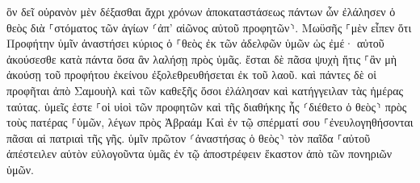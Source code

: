 \documentclass{openreader}
\begin{document}
ὃν δεῖ οὐρανὸν μὲν δέξασθαι ἄχρι χρόνων ἀποκαταστάσεως πάντων ὧν ἐλάλησεν ὁ θεὸς διὰ ⸀στόματος τῶν ἁγίων ⸂ἀπ’ αἰῶνος αὐτοῦ προφητῶν⸃. 
Μωϋσῆς ⸀μὲν εἶπεν ὅτι Προφήτην ὑμῖν ἀναστήσει κύριος ὁ ⸀θεὸς ἐκ τῶν ἀδελφῶν ὑμῶν ὡς ἐμέ· αὐτοῦ ἀκούσεσθε κατὰ πάντα ὅσα ἂν λαλήσῃ πρὸς ὑμᾶς. 
ἔσται δὲ πᾶσα ψυχὴ ἥτις ⸀ἂν μὴ ἀκούσῃ τοῦ προφήτου ἐκείνου ἐξολεθρευθήσεται ἐκ τοῦ λαοῦ. 
καὶ πάντες δὲ οἱ προφῆται ἀπὸ Σαμουὴλ καὶ τῶν καθεξῆς ὅσοι ἐλάλησαν καὶ κατήγγειλαν τὰς ἡμέρας ταύτας. 
ὑμεῖς ἐστε ⸀οἱ υἱοὶ τῶν προφητῶν καὶ τῆς διαθήκης ἧς ⸂διέθετο ὁ θεὸς⸃ πρὸς τοὺς πατέρας ⸀ὑμῶν, λέγων πρὸς Ἀβραάμ Καὶ ἐν τῷ σπέρματί σου ⸀ἐνευλογηθήσονται πᾶσαι αἱ πατριαὶ τῆς γῆς. 
ὑμῖν πρῶτον ⸂ἀναστήσας ὁ θεὸς⸃ τὸν παῖδα ⸀αὐτοῦ ἀπέστειλεν αὐτὸν εὐλογοῦντα ὑμᾶς ἐν τῷ ἀποστρέφειν ἕκαστον ἀπὸ τῶν πονηριῶν ὑμῶν. 
\end{document}
